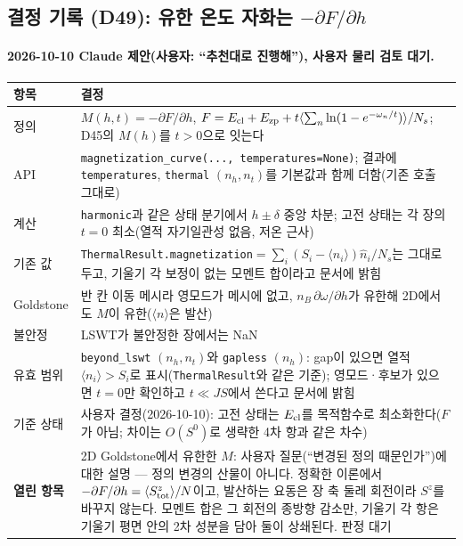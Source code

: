\subsection{결정 기록 (D49): 유한 온도 자화는 $-\partial F/\partial h$}\label{decisions-d49-thermal-magnetization}
\begingroup%
  \framesubtitle{2026-10-10 Claude 제안(사용자: ``추천대로 진행해''), 사용자 물리 검토 대기.}
  \small\renewcommand{\arraystretch}{1.12}
  \begin{tabularx}{\textwidth}{@{}P{3.0cm}Y@{}}
    \toprule
    항목 & 결정 \\
    \midrule
    정의 & $M(h,t)=-\partial F/\partial h$, $F=E_{\rm cl}+E_{\rm zp}+t\langle\sum_n\ln(1-e^{-\omega_n/t})\rangle/N_s$; D45의 $M(h)$를 $t>0$으로 잇는다 \\
    API & \texttt{magnetization\_curve(..., temperatures=None)}; 결과에 \texttt{temperatures}, \texttt{thermal} $(n_h, n_t)$를 기본값과 함께 더함(기존 호출 그대로) \\
    계산 & \texttt{harmonic}과 같은 상태 분기에서 $h\pm\delta$ 중앙 차분; 고전 상태는 각 장의 $t=0$ 최소(열적 자기일관성 없음, 저온 근사) \\
    기존 값 & \texttt{ThermalResult.magnetization}$=\sum_i(S_i-\langle n_i\rangle)\hat n_i/N_s$는 그대로 두고, 기울기 각 보정이 없는 모멘트 합이라고 문서에 밝힘 \\
    Goldstone & 반 칸 이동 메시라 영모드가 메시에 없고, $n_B\,\partial\omega/\partial h$가 유한해 2D에서도 $M$이 유한($\langle n\rangle$은 발산) \\
    불안정 & LSWT가 불안정한 장에서는 NaN \\
    \midrule
    유효 범위 & \texttt{beyond\_lswt} $(n_h,n_t)$와 \texttt{gapless} $(n_h)$: gap이 있으면 열적 $\langle n_i\rangle>S_i$로 표시(\texttt{ThermalResult}와 같은 기준); 영모드·후보가 있으면 $t=0$만 확인하고 $t\ll JS$에서 쓴다고 문서에 밝힘 \\
    기준 상태 & 사용자 결정(2026-10-10): 고전 상태는 $E_{\rm cl}$를 목적함수로 최소화한다($F$가 아님; 차이는 $O(S^0)$로 생략한 4차 항과 같은 차수) \\
    \textbf{열린 항목} & 2D Goldstone에서 유한한 $M$: 사용자 질문(``변경된 정의 때문인가'')에 대한 설명 — 정의 변경의 산물이 아니다. 정확한 이론에서 $-\partial F/\partial h=\langle S^z_{\rm tot}\rangle/N$이고, 발산하는 요동은 장 축 둘레 회전이라 $S^z$를 바꾸지 않는다. 모멘트 합은 그 회전의 종방향 감소만, 기울기 각 항은 기울기 평면 안의 2차 성분을 담아 둘이 상쇄된다. 판정 대기 \\
    \bottomrule
  \end{tabularx}
\endgroup



